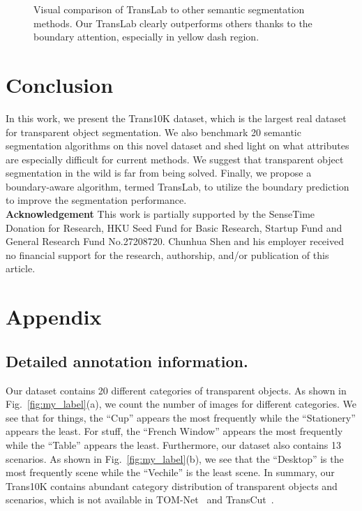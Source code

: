 \documentclass[runningheads]{llncs}
\begin{document}
{\begin{table}[ht]
\begin{minipage}[ht]{8cm}
    \end{minipage}
    \label{tab:my_label}
    \end{table}
     \begin{figure}[ht]
        \centering
        \caption{Visual comparison of TransLab to other semantic segmentation methods. Our TransLab clearly outperforms others thanks to the boundary attention, especially in yellow dash region.}
        \label{fig:res}
    \end{figure}

    \section{Conclusion}
    In this work, we present the Trans10K dataset, which is the largest real dataset for transparent object segmentation.
    We also benchmark 20 semantic segmentation algorithms on this novel dataset and shed light on what attributes are especially difficult for current methods. We suggest that transparent object segmentation in the wild is far from being solved. Finally, we propose a boundary-aware algorithm, termed TransLab, to utilize the boundary prediction to improve the segmentation performance. \\
    \textbf{Acknowledgement}
This work is partially supported by the SenseTime Donation for Research, HKU Seed Fund for Basic Research, Startup Fund and General Research Fund No.27208720. Chunhua Shen and his employer received no financial support for the research, authorship, and/or publication of this article.

    \clearpage





    \appendix
    \section{Appendix}
    \subsection{Detailed annotation information.}
    Our dataset contains 20 different categories of transparent objects. As shown in Fig.~\ref{fig:my_label}(a), we count the number of images for different categories. We see that for things, the ``Cup'' appears the most frequently  while the ``Stationery'' appears the least.
    For stuff, the ``French Window'' appears the most frequently while the ``Table'' appears the least.
    Furthermore, our dataset also contains 13 scenarios. As shown in Fig.~\ref{fig:my_label}(b), we see that the ``Desktop'' is the most frequently scene while the ``Vechile'' is the least scene.
    In summary, our Trans10K contains abundant category distribution of transparent objects and scenarios, which is not available in TOM-Net~\cite{tomnet} and TransCut~\cite{transcut}.

}
\end{document}
